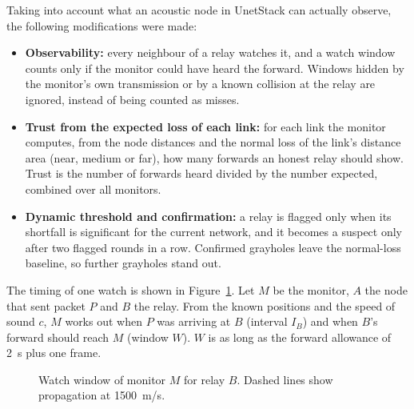 \documentclass[conference]{IEEEtran}
\begin{document}
Taking into account what an acoustic node in UnetStack can actually observe, the following modifications were made:
\begin{itemize}
\item \textbf{Observability:} every neighbour of a relay watches it, and a watch window counts only if the monitor could have heard the forward. Windows hidden by the monitor's own transmission or by a known collision at the relay are ignored, instead of being counted as misses.
\item \textbf{Trust from the expected loss of each link:} for each link the monitor computes, from the node distances and the normal loss of the link's distance area (near, medium or far), how many forwards an honest relay should show. Trust is the number of forwards heard divided by the number expected, combined over all monitors.
\item \textbf{Dynamic threshold and confirmation:} a relay is flagged only when its shortfall is significant for the current network, and it becomes a suspect only after two flagged rounds in a row. Confirmed grayholes leave the normal-loss baseline, so further grayholes stand out.
\end{itemize}

The timing of one watch is shown in Figure~\ref{fig:window}. Let $M$ be the monitor, $A$ the node that sent packet $P$ and $B$ the relay. From the known positions and the speed of sound $c$, $M$ works out when $P$ was arriving at $B$ (interval $I_B$) and when $B$'s forward should reach $M$ (window $W$). $W$ is as long as the forward allowance of 2~s plus one frame.

\begin{figure}[t]\centering
{}
\caption{Watch window of monitor $M$ for relay $B$. Dashed lines show propagation at 1500~m/s.}\label{fig:window}
\end{figure}
\end{document}
